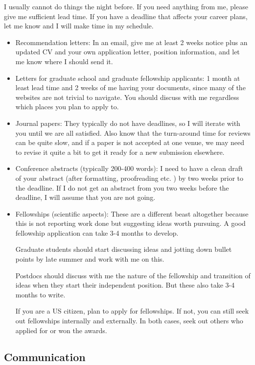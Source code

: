 \documentclass[12pt]{article}
\begin{document}
I usually cannot do things the night before.
If you need anything from me, please give me sufficient lead time.
If you have a deadline that affects your career plans, let me know and I will make time in my schedule.

\begin{itemize}
  \item Recommendation letters: In an email, give me at least 2 weeks notice plus an updated CV and your own application letter, position information, and let me know where I should send it.
  \item Letters for graduate school and graduate fellowship applicants: 1 month at least lead time and 2 weeks of me having your documents, since many of the websites are not trivial to navigate.
        You should discuss with me regardless which places you plan to apply to.
  \item Journal papers: They typically do not have deadlines, so I will iterate with you until we are all satisfied.
        Also know that the turn-around time for reviews can be quite slow, and if a paper is not accepted at one venue, we may need to revise it quite a bit to get it ready for a new submission elsewhere.
  \item Conference abstracts (typically 200-400 words): I need to have a clean draft of your abstract (after formatting, proofreading etc. ) by two weeks prior to the deadline.
        If I do not get an abstract from you two weeks before the deadline, I will assume that you are not going.
  \item Fellowships (scientific aspects): These are a different beast altogether because this is not reporting work done but suggesting ideas worth pursuing.
        A good fellowship application can take 3-4 months to develop.

        Graduate students should start discussing ideas and jotting down bullet points by late summer and work with me on this.

        Postdocs should discuss with me the nature of the fellowship and transition of ideas when they start their independent position.
        But these also take 3-4 months to write.

        If you are a US citizen, plan to apply for fellowships.
        If not, you can still seek out fellowships internally and externally.
        In both cases, seek out others who applied for or won the awards.
\end{itemize}

\subsection{Communication}
\end{document}
